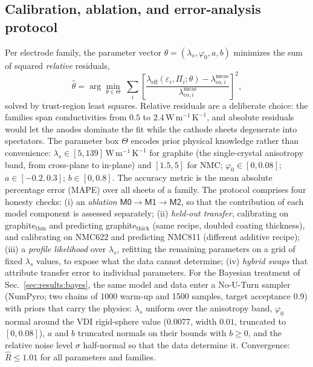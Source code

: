 \documentclass[10pt,a4paper]{article}
\newcommand{\leff}{\lambda_{\mathrm{eff}}}
\newcommand{\lams}{\lambda_{s}}
\newcommand{\WmK}{\,\mathrm{W\,m^{-1}\,K^{-1}}}
\newcommand{\Mzero}{\ensuremath{\mathsf{M0}}}
\newcommand{\Mone}{\ensuremath{\mathsf{M1}}}
\newcommand{\Mtwo}{\ensuremath{\mathsf{M2}}}
\begin{document}
\subsection{Calibration, ablation, and error-analysis protocol}
\label{sec:data:protocol}
Per electrode family, the parameter vector $\theta=(\lams,\varphi_0,a,b)$ minimizes the sum of squared \emph{relative} residuals,
\begin{equation}
\hat\theta=\arg\min_{\theta\in\Theta}\;
\sum_{i}\left[\frac{\leff(\varepsilon_i,\Pi_i;\theta)-\lambda^{\mathrm{meas}}_{\mathrm{co},i}}{\lambda^{\mathrm{meas}}_{\mathrm{co},i}}\right]^{2},
\label{eq:objective}
\end{equation}
solved by trust-region least squares. Relative residuals are a deliberate choice: the families span conductivities from $0.5$ to $2.4\WmK$, and absolute residuals would let the anodes dominate the fit while the cathode sheets degenerate into spectators. The parameter box $\Theta$ encodes prior physical knowledge rather than convenience: $\lams\in[5,139]\WmK$ for graphite (the single-crystal anisotropy band, from cross-plane to in-plane) and $[1.5,5]$ for NMC; $\varphi_0\in[0,0.08]$; $a\in[-0.2,0.3]$; $b\in[0,0.8]$. The accuracy metric is the mean absolute percentage error (MAPE) over all sheets of a family. The protocol comprises four honesty checks: (i) an \emph{ablation} \Mzero$\to$\Mone$\to$\Mtwo, so that the contribution of each model component is assessed separately; (ii) \emph{held-out transfer}, calibrating on graphite$_{\mathrm{thin}}$ and predicting graphite$_{\mathrm{thick}}$ (same recipe, doubled coating thickness), and calibrating on NMC622 and predicting NMC811 (different additive recipe); (iii) a \emph{profile likelihood} over $\lams$, refitting the remaining parameters on a grid of fixed $\lams$ values, to expose what the data cannot determine; (iv) \emph{hybrid swaps} that attribute transfer error to individual parameters. For the Bayesian treatment of Sec.~\ref{sec:results:bayes}, the same model and data enter a No-U-Turn sampler (NumPyro; two chains of 1000 warm-up and 1500 samples, target acceptance 0.9) with priors that carry the physics: $\lams$ uniform over the anisotropy band, $\varphi_0$ normal around the VDI rigid-sphere value ($0.0077$, width $0.01$, truncated to $[0,0.08]$), $a$ and $b$ truncated normals on their bounds with $b\ge0$, and the relative noise level $\sigma$ half-normal so that the data determine it. Convergence: $\hat R\le1.01$ for all parameters and families.

\end{document}
